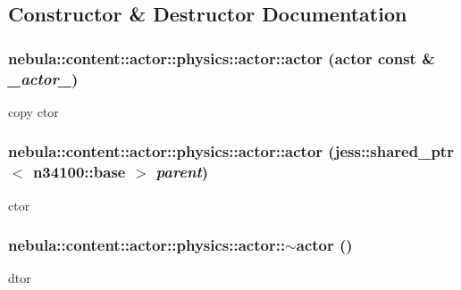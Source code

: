 \subsection{Constructor \& Destructor Documentation}
\hypertarget{classnebula_1_1content_1_1actor_1_1physics_1_1actor_a82742d9479e4c56498e5dbff6e7c5929}{
\subsubsection[{actor}]{\setlength{\rightskip}{0pt plus 5cm}nebula::content::actor::physics::actor::actor ({\bf actor} const \& {\em \_\-actor\_\-})}}
\label{classnebula_1_1content_1_1actor_1_1physics_1_1actor_a82742d9479e4c56498e5dbff6e7c5929}


copy ctor \hypertarget{classnebula_1_1content_1_1actor_1_1physics_1_1actor_a0c3272c3403989fcdb0473626828e1bc}{
\subsubsection[{actor}]{\setlength{\rightskip}{0pt plus 5cm}nebula::content::actor::physics::actor::actor (jess::shared\_\-ptr$<$ {\bf n34100::base} $>$ {\em parent})}}
\label{classnebula_1_1content_1_1actor_1_1physics_1_1actor_a0c3272c3403989fcdb0473626828e1bc}


ctor \hypertarget{classnebula_1_1content_1_1actor_1_1physics_1_1actor_ab55f739894c43f00ba9b60b0a54c12be}{
\subsubsection[{$\sim$actor}]{\setlength{\rightskip}{0pt plus 5cm}nebula::content::actor::physics::actor::$\sim$actor ()}}
\label{classnebula_1_1content_1_1actor_1_1physics_1_1actor_ab55f739894c43f00ba9b60b0a54c12be}


dtor 

